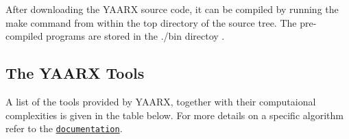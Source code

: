 \-After downloading the \-Y\-A\-A\-R\-X source code, it can be compiled by running the make command from within the top directory of the source tree. \-The pre-\/compiled programs are stored in the ./bin directoy .\hypertarget{index_tools_sec}{}\subsection{\-The Y\-A\-A\-R\-X Tools}\label{index_tools_sec}
\-A list of the tools provided by \-Y\-A\-A\-R\-X, together with their computaional complexities is given in the table below. \-For more details on a specific algorithm refer to the \href{file:///home/vpv/skcrypto/trunk/work/src/yaarx/doc/html/files.html}{\tt documentation}. \par
 \par


